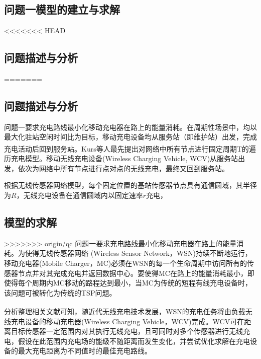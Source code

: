 \documentclass{whutmod}
\newcommand{\upcite}[1]{\textsuperscript{\cite{#1}}}
\begin{document}
\begin{table}[H]
\begin{tablenotes}
	\section{问题一模型的建立与求解}
<<<<<<< HEAD
		\subsection{问题描述与分析}		
=======
		\subsection{问题描述与分析}


			问题一要求充电路线最小化移动充电器在路上的能量消耗。在周期性场景中，均以最大化驻站空闲时间比为目标，移动充电设备均从服务站（即维护站）出发，完成充电活动后回到服务站。Kurs等人\upcite{4}最先提出对网络中所有节点进行固定周期T的遍历充电模型。移动无线充电设备(Wireless Charging Vehicle, WCV)从服务站出发，依次为网络中所有节点进行点对点的无线充电，最终又回到服务站。
			
			根据无线传感器网络模型，每个固定位置的基站传感器节点具有通信圆域，其半径为$R$，无线充电设备在通信圆域内以固定速率$r$充电，

		\subsection{模型的求解}


%			
%

		
>>>>>>> origin/qc
			问题一要求充电路线最小化移动充电器在路上的能量消耗。为使得无线传感器网络
		(Wireless Sensor Network，WSN)持续不断地运行，移动充电器(Mobile Charger，MC)必须在WSN的每一个生命周期中访问所有的传感器节点并对其完成充电并返回数据中心。要使得MC在路上的能量消耗最小，即使得每个周期内MC移动的路程达到最小，当MC为传统的短程有线充电设备时，该问题可被转化为传统的TSP问题。
		    
		    分析整理相关文献可知\upcite{4,5}，随近代无线充电技术发展，WSN的充电任务将由负载无线充电设备的移动充电器(Wireless Charging Vehicle，WCV)完成。WCV可在距离目标传感器一定范围内对其执行无线充电，且可同时对多个传感器进行无线充电，假设在此范围内充电场的能级不随距离而发生变化，并尝试优化求解在充电设备的最大充电距离为不同值时的最佳充电路线。
		    

\end{tablenotes}
\end{table}
\end{document}
